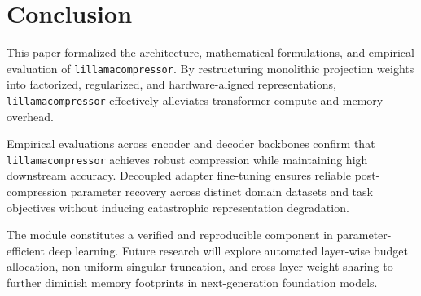 \section{Conclusion}
This paper formalized the architecture, mathematical formulations, and empirical evaluation of \texttt{lillamacompressor}. By restructuring monolithic projection weights into factorized, regularized, and hardware-aligned representations, \texttt{lillamacompressor} effectively alleviates transformer compute and memory overhead.

Empirical evaluations across encoder and decoder backbones confirm that \texttt{lillamacompressor} achieves robust compression while maintaining high downstream accuracy. Decoupled adapter fine-tuning ensures reliable post-compression parameter recovery across distinct domain datasets and task objectives without inducing catastrophic representation degradation.

The module constitutes a verified and reproducible component in parameter-efficient deep learning. Future research will explore automated layer-wise budget allocation, non-uniform singular truncation, and cross-layer weight sharing to further diminish memory footprints in next-generation foundation models.
